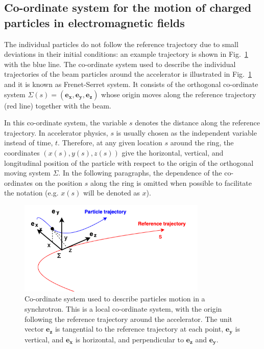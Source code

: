 \subsection{Co-ordinate system for the motion of charged particles in electromagnetic fields}\label{subsec:coordinate_system}
The individual particles do not follow the reference trajectory due to small deviations in their initial conditions: an example trajectory is shown in Fig.~\ref{fig:coordinate_system} with the blue line. The co-ordinate system used to describe the individual trajectories of the beam particles around the accelerator is illustrated in Fig.~\ref{fig:coordinate_system} and it is known as Frenet-Serret system.  It consists of the orthogonal co-ordinate system $\Sigma(s) = (\mathbf{e_x}, \mathbf{e_y}, \mathbf{e_z})$ whose origin moves along the reference trajectory (red line) together with the beam. 

In this co-ordinate system, the variable $s$ denotes the distance along the reference trajectory. In accelerator physics, $s$ is usually chosen as the independent variable instead of time, $t$.  %
Therefore, at any given location $s$ around the ring, the coordinates $(x(s), y(s), z(s))$ give the horizontal, vertical, and longitudinal position of the particle with respect to the origin of the orthogonal moving system $\Sigma$. In the following paragraphs, the dependence of the co-ordinates on the position $s$ along the ring is omitted when possible to facilitate the notation (e.g. $x(s)$ will be denoted as $x$).

\begin{figure}[!h] %
    \centering         
    \includegraphics[width=0.8\textwidth]{images/Ch2/coordinates_particle_motion.png}
        \caption{Co-ordinate system used to describe particles motion in a synchrotron. This is a local co-ordinate system, with the origin following the reference trajectory around the accelerator.  The unit vector $\mathbf{e_z}$ is tangential to the reference trajectory at each point, $\mathbf{e_y}$ is vertical, and $\mathbf{e_x}$ is horizontal, and perpendicular to $\mathbf{e_z}$ and $\mathbf{e_y}$.}
        \label{fig:coordinate_system}
 \end{figure}


